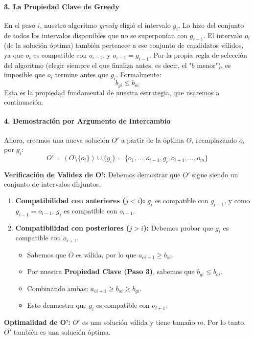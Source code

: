 \documentclass[12pt, a4paper]{article}
\begin{document}
\paragraph{3. La Propiedad Clave de Greedy}
En el paso $i$, nuestro algoritmo \textit{greedy} eligió el intervalo $g_i$. Lo hizo del conjunto de 
todos los intervalos disponibles que no se superponían con $g_{i-1}$.
El intervalo $o_i$ (de la solución óptima) también pertenece a ese conjunto de candidatos válidos, 
ya que $o_i$ es compatible con $o_{i-1}$, y $o_{i-1} = g_{i-1}$.
Por la propia regla de selección del algoritmo (elegir siempre el que finaliza antes, es decir, el "$b$ menor"), es 
imposible que $o_i$ termine antes que $g_i$. Formalmente:
\[ b_{gi} \le b_{oi} \]
Esta es la propiedad fundamental de nuestra estrategia, que usaremos a continuación.

\paragraph{4. Demostración por Argumento de Intercambio}
Ahora, creemos una nueva solución $O'$ a partir de la óptima $O$, reemplazando $o_i$ por $g_i$:
\[ O' = (O \setminus \{o_i\}) \cup \{g_i\} = \{o_1, \dots, o_{i-1}, g_i, o_{i+1}, \dots, o_m\} \]

\textbf{Verificación de Validez de O':} Debemos demostrar que $O'$ sigue siendo un conjunto de intervalos disjuntos.
    \begin{enumerate}
        \item \textbf{Compatibilidad con anteriores ($j < i$):} $g_i$ es compatible con $g_{i-1}$, y como $g_{i-1} = o_{i-1}$, $g_i$ es compatible con $o_{i-1}$.
        \item \textbf{Compatibilidad con posteriores ($j > i$):} Debemos probar que $g_i$ es compatible con $o_{i+1}$.
        \begin{itemize}
            \item Sabemos que $O$ es válida, por lo que $a_{oi+1}\ge b_{oi}$.
            \item Por nuestra \textbf{Propiedad Clave (Paso 3)}, sabemos que $b_{gi} \le b_{oi}$.
            \item Combinando ambas: $a_{oi+1} \ge b_{oi} \ge b_{gi}$.
            \item Esto demuestra que $g_i$ es compatible con $o_{i+1}$.
        \end{itemize}
    \end{enumerate}
\textbf{Optimalidad de O':} $O'$ es una solución válida y tiene tamaño $m$. Por lo tanto, $O'$ 
también es una solución óptima.
\end{document}
